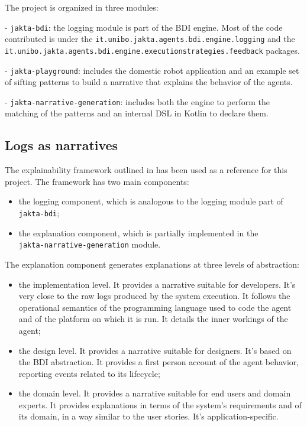 \documentclass{scrartcl}
\begin{document}
The project is organized in three modules:

- \verb|jakta-bdi|: the logging module is part of the BDI engine. Most of the code contributed is under the \verb|it.unibo.jakta.agents.bdi.engine.logging| and the \\ \verb|it.unibo.jakta.agents.bdi.engine.executionstrategies.feedback| packages.

- \verb|jakta-playground|: includes the domestic robot application and an example set of sifting patterns to build a narrative that explains the behavior of the agents.

- \verb|jakta-narrative-generation|: includes both the engine to perform the matching of the patterns and an internal DSL in Kotlin to declare them.

\subsection{Logs as narratives}

The explainability framework outlined in \cite{DBLP:journals/aamas/YanBHR25} has been used as a reference for this project. The framework has two main components:

\begin{itemize}
    \item the logging component, which is analogous to the logging module part of \verb|jakta-bdi|;
    \item the explanation component, which is partially implemented in the \\ \verb|jakta-narrative-generation| module.
\end{itemize}

The explanation component generates explanations at three levels of abstraction:

\begin{itemize}
    \item the implementation level. It provides a narrative suitable for developers. It’s very close to the raw logs produced by the system execution. It follows the operational semantics of the programming language used to code the agent and of the platform on which it is run. It details the inner workings of the agent;
    \item the design level. It provides a narrative suitable for designers. It’s based on the BDI
abstraction. It provides a first person account of the agent behavior, reporting events
related to its lifecycle;
    \item the domain level. It provides a narrative suitable for end users and domain experts. It
provides explanations in terms of the system’s requirements and of its domain, in a way
similar to the user stories. It’s application-specific.
\end{itemize}
\end{document}
